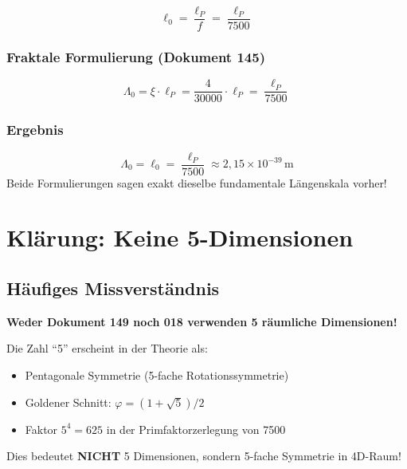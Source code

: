 	\begin{equation}
		\ell_0 = \frac{\ell_P}{f} = \frac{\ell_P}{7500}
	\end{equation}
	
	\subsubsection{Fraktale Formulierung (Dokument 145)}
	
	\begin{equation}
		\Lambda_0 = \xi \cdot \ell_P = \frac{4}{30000} \cdot \ell_P = \frac{\ell_P}{7500}
	\end{equation}
	
	\subsubsection{Ergebnis}
	
	\begin{keyresult}
		\begin{equation}
			\boxed{\Lambda_0 = \ell_0 = \frac{\ell_P}{7500} \approx 2{,}15 \times 10^{-39}\,\text{m}}
		\end{equation}
		Beide Formulierungen sagen exakt dieselbe fundamentale Längenskala vorher!
	\end{keyresult}
	
	\section{Klärung: Keine 5-Dimensionen}
	
	\subsection{Häufiges Missverständnis}
	
	\begin{warning}
		\textbf{Weder Dokument 149 noch 018 verwenden 5 räumliche Dimensionen!}
		
		Die Zahl \enquote{5} erscheint in der Theorie als:
		\begin{itemize}
			\item Pentagonale Symmetrie (5-fache Rotationssymmetrie)
			\item Goldener Schnitt: $\varphi = (1+\sqrt{5})/2$
			\item Faktor $5^4 = 625$ in der Primfaktorzerlegung von 7500
		\end{itemize}
		
		Dies bedeutet \textbf{NICHT} 5 Dimensionen, sondern 5-fache Symmetrie in 4D-Raum!
	\end{warning}
	
